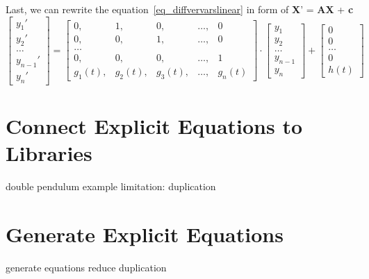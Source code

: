 Last, we can rewrite the equation~\ref{eq_diffvervarslinear} in form of \textbf{X}' = \textbf{AX} + \textbf{c}
\begin{equation}
	\begin{bmatrix}
		y_{1}' \\
    y_{2}' \\
    \dots  \\
    y_{n-1}' \\
    y_{n}'
	\end{bmatrix}
    = 
  \begin{bmatrix}
		0, & 1, & 0, & \dots, & 0 \\
    0, & 0, & 1, & \dots, & 0 \\
    \dots \\
    0, & 0, & 0, & \dots, & 1 \\
    g_{1}(t), & g_{2}(t), & g_{3}(t), & \dots, & g_{n}(t)
	\end{bmatrix}
    \cdot
  \begin{bmatrix}
		y_{1} \\
    y_{2} \\
    \dots  \\
    y_{n-1} \\
    y_{n}
	\end{bmatrix}
    + 
  \begin{bmatrix}
    0 \\
    0 \\
    \dots  \\
    0 \\
    h(t)
	\end{bmatrix}
\end{equation}

\section{Connect Explicit Equations to Libraries}
\label{se_connecteetolib}
double pendulum example
limitation: duplication

\section{Generate Explicit Equations}
generate equations
reduce duplication

